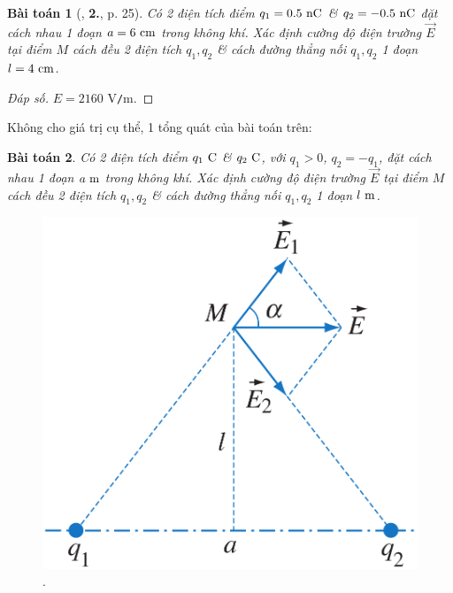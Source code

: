 \documentclass[oneside]{book}
\numberwithin{equation}{section}
\newtheorem{baitoan}{Bài toán}[section]
\begin{document}
\begin{baitoan}[\cite{SGK_Vat_Ly_11_nang_cao}, \textbf{2.}, p. 25]
	Có 2 điện tích điểm $q_1 = 0.5\ {\rm nC}$ \& $q_2 = -0.5\ {\rm nC}$ đặt cách nhau 1 đoạn $a = 6\ {\rm cm}$ trong không khí. Xác định cường độ điện trường $\overrightarrow{E}$ tại điểm $M$ cách đều 2 điện tích $q_1,q_2$ \& cách đường thẳng nối $q_1,q_2$ 1 đoạn $l = 4\ {\rm cm}$.
\end{baitoan}

\begin{proof}[Đáp số]
	$E = 2160$ V\texttt{/}m.
\end{proof}
Không cho giá trị cụ thể, 1 tổng quát của bài toán trên:

\begin{baitoan}
	Có 2 điện tích điểm $q_1\ {\rm C}$ \& $q_2\ {\rm C}$, với $q_1 > 0$, $q_2 = -q_1$, đặt cách nhau 1 đoạn $a\ {\rm m}$ trong không khí. Xác định cường độ điện trường $\overrightarrow{E}$ tại điểm $M$ cách đều 2 điện tích $q_1,q_2$ \& cách đường thẳng nối $q_1,q_2$ 1 đoạn $l\ {\rm m}$.
\end{baitoan}

\begin{figure}[H]
	\centering
	\includegraphics[scale=0.15]{2_dien_tich_tam_giac_can}
	\caption{\cite[Hình 5.2, p. 26]{SGK_Vat_Ly_11_nang_cao}.}
	\label{fig:2_dien_tich_tam_giac_can}
\end{figure}
\end{document}
